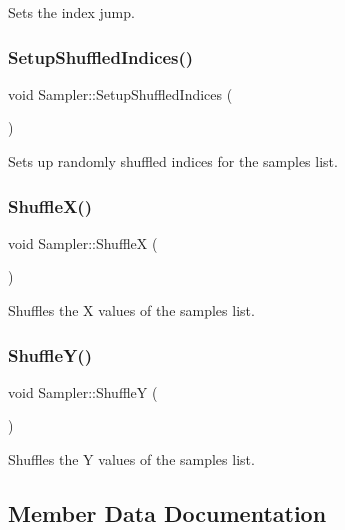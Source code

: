 Sets the index jump. \hypertarget{class_sampler_a594169bdbb1673edbd53ec3937841df4}{}\label{class_sampler_a594169bdbb1673edbd53ec3937841df4} 
\subsubsection{\texorpdfstring{Setup\+Shuffled\+Indices()}{SetupShuffledIndices()}}
{\footnotesize\ttfamily void Sampler\+::\+Setup\+Shuffled\+Indices (\begin{DoxyParamCaption}{ }\end{DoxyParamCaption})}

Sets up randomly shuffled indices for the samples list. \hypertarget{class_sampler_afc858c17a6f559d4178e37285eea8f25}{}\label{class_sampler_afc858c17a6f559d4178e37285eea8f25} 
\subsubsection{\texorpdfstring{Shuffle\+X()}{ShuffleX()}}
{\footnotesize\ttfamily void Sampler\+::\+ShuffleX (\begin{DoxyParamCaption}{ }\end{DoxyParamCaption})}

Shuffles the X values of the samples list. \hypertarget{class_sampler_a685b224ed1cc1a70a0ca602f7b2f6384}{}\label{class_sampler_a685b224ed1cc1a70a0ca602f7b2f6384} 
\subsubsection{\texorpdfstring{Shuffle\+Y()}{ShuffleY()}}
{\footnotesize\ttfamily void Sampler\+::\+ShuffleY (\begin{DoxyParamCaption}{ }\end{DoxyParamCaption})}

Shuffles the Y values of the samples list. 

\subsection{Member Data Documentation}
\hypertarget{class_sampler_abb6650869ddaf8002831d257b1b8c426}{}\label{class_sampler_abb6650869ddaf8002831d257b1b8c426} 

